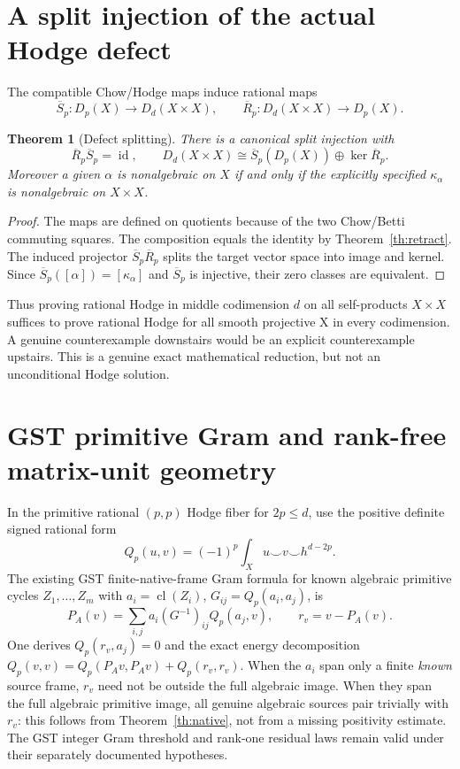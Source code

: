\documentclass[11pt,a4paper]{article}
\newtheorem{theorem}{Theorem}[section]
\newcommand{\cl}{\operatorname{cl}}
\newcommand{\id}{\operatorname{id}}
\begin{document}
\section{A split injection of the actual Hodge defect}
The compatible Chow/Hodge maps induce rational maps
\[
 \overline S_p:D_p(X)\longrightarrow D_d(X\times X),
 \qquad
 \overline R_p:D_d(X\times X)\longrightarrow D_p(X).
\]
\begin{theorem}[Defect splitting]\label{th:defectsplit}
There is a canonical split injection with
\[
 \overline R_p\overline S_p=\id,\qquad
 D_d(X\times X)\cong
     \overline S_p(D_p(X))\oplus\ker\overline R_p.
 \tag{5.1}
\]
Moreover a given \(\alpha\) is nonalgebraic on \(X\) if and only if
the explicitly specified \(\kappa_\alpha\) is nonalgebraic
on \(X\times X\).
\end{theorem}
\begin{proof}
The maps are defined on quotients because of the two
Chow/Betti commuting squares.  The composition equals
the identity by Theorem~\ref{th:retract}.  The induced
projector \(\overline S_p\overline R_p\) splits the target
vector space into image and kernel.  Since
\(\overline S_p([\alpha])=[\kappa_\alpha]\) and
\(\overline S_p\) is injective, their zero classes
are equivalent.
\end{proof}
Thus proving rational Hodge in middle codimension \(d\)
on all self-products \(X\times X\) suffices to prove
rational Hodge for all smooth projective X in every
codimension.  A genuine counterexample downstairs
would be an explicit counterexample upstairs.
This is a genuine exact mathematical reduction,
but not an unconditional Hodge solution.

\section{GST primitive Gram and rank-free matrix-unit geometry}
In the primitive rational \((p,p)\) Hodge fiber for
\(2p\le d\), use the positive definite signed rational form
\[
 Q_p(u,v)=(-1)^p\int_X u\smile v\smile h^{d-2p}.
 \tag{6.1}
\]
The existing GST finite-native-frame Gram formula
for known algebraic primitive cycles \(Z_1,\ldots,Z_m\)
with \(a_i=\cl(Z_i)\), \(G_{ij}=Q_p(a_i,a_j)\), is
\[
 P_A(v)=\sum_{i,j}a_i(G^{-1})_{ij}Q_p(a_j,v),
 \qquad r_v=v-P_A(v). \tag{6.2}
\]
One derives \(Q_p(r_v,a_j)=0\) and the exact energy
decomposition \(Q_p(v,v)=Q_p(P_Av,P_Av)+Q_p(r_v,r_v)\).
When the \(a_i\) span only a finite \emph{known} source
frame, \(r_v\) need not be outside the full algebraic image.
When they span the full algebraic primitive image,
all genuine algebraic sources pair trivially with \(r_v\):
this follows from Theorem~\ref{th:native}, not from a
missing positivity estimate.  The GST integer Gram
threshold and rank-one residual laws remain valid
under their separately documented hypotheses.
\end{document}
